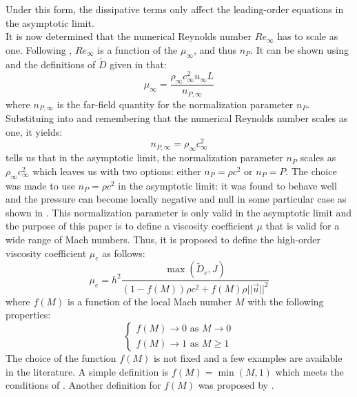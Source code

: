 Under this form, the dissipative terms only affect the leading-order equations in the asymptotic limit.\\
It is now determined that the numerical Reynolds number $Re_{\infty}$ has to scale as one. Following , $Re_{\infty}$ is a function of the $\mu_{\infty}$, and thus $n_P$. It can be shown using  and the definitions of $\tilde{D}$ given in  that:
\begin{equation}
\label{eq:norm_relation}
\mu_{\infty} = \frac{ \rho_{\infty} c_{\infty}^2 u_{\infty} L }{ n_{P,\infty} }
\end{equation}
where $n_{P,\infty}$ is the far-field quantity for the normalization parameter $n_P$. Substituing  into  and remembering that the numerical Reynolds number scales as one, it yields:
\begin{equation}
\label{eq:norm_relation_bis}
n_{P,\infty} = \rho_{\infty} c_{\infty}^2
\end{equation}
 tells us that in the asymptotic limit, the normalization parameter $n_P$ scales as $\rho_{\infty} c_{\infty}^2$ which leaves us with two options:
either $n_P = \rho c^2$ or $n_P = P$. The choice was made to use $n_P = \rho c^2$ in the asymptotic limit: it was found to behave well and the pressure can become locally negative and null in some particular case as shown in . This normalization parameter is only valid in the asymptotic limit and the purpose of this paper is to define a viscosity coefficient $\mu$ that is valid for a wide range of Mach numbers. Thus, it is proposed to define the high-order viscosity coefficient $\mu_e$ as follows:
\begin{equation}
\mu_e = h^2 \frac{\max (\tilde{D}_e, J)}{(1-f(M) )\rho c^2 + f(M) \rho || \vec{u} ||^2}
\end{equation} 
where $f(M)$ is a function of the local Mach number $M$ with the following properties:
\begin{equation}
\label{eq:fM_def}
\left\{
\begin{array}{l}
f(M) \to 0 \text{ as } M \to 0 \\
f(M) \to 1 \text{ as } M \geq 1 
\end{array}
\right.
\end{equation} 
The choice of the function $f(M)$ is not fixed and a few examples are available in the literature. A simple definition is $f(M) = \min (M,1)$ which meets the conditions of . Another definition for $f(M)$ was proposed by \cite{Roe}.

